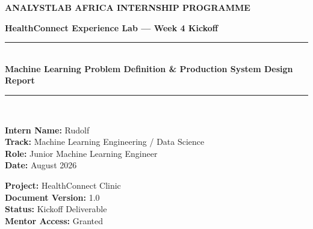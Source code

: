 \documentclass[11pt,a4paper]{article}
\begin{document}
\begin{titlepage}
\centering
\vspace*{1cm}
{\huge\bfseries\color{primary} ANALYSTLAB AFRICA INTERNSHIP PROGRAMME\par}
\vspace{0.5cm}
{\Large\bfseries\color{secondary} HealthConnect Experience Lab — Week 4 Kickoff\par}
\vspace{1.5cm}

\rule{\linewidth}{1.5pt}\\[0.4cm]
{\huge \bfseries Machine Learning Problem Definition \& Production System Design Report}\\[0.4cm]
\rule{\linewidth}{1.5pt}\\[1.5cm]

\begin{minipage}{0.48\textwidth}
\begin{flushleft} \large
\textbf{Intern Name:} Rudolf\\
\textbf{Track:} Machine Learning Engineering / Data Science\\
\textbf{Role:} Junior Machine Learning Engineer\\
\textbf{Date:} August 2026
\end{flushleft}
\end{minipage}
\begin{minipage}{0.48\textwidth}
\begin{flushright} \large
\textbf{Project:} HealthConnect Clinic\\
\textbf{Document Version:} 1.0\\
\textbf{Status:} Kickoff Deliverable\\
\textbf{Mentor Access:} Granted
\end{flushright}
\end{minipage}

\vfill
\begin{abstract}
\noindent This document establishes the foundational Machine Learning Problem Definition and Production System Architecture for the HealthConnect Clinic Experience Lab. Facing high non-attendance rates ($48.46\%$ baseline no-show rate), HealthConnect Clinic requires an automated, predictive, and actionable system to mitigate appointment missed slots, optimize provider schedule utilization, and improve patient support. We formulate a supervised binary classification task $P(\text{No-Show} \mid X)$, evaluate data quality across 5,000 appointment records, present a candidate feature taxonomy across 6 domain categories, define strict data leakage boundaries, and detail an end-to-end production ML system design incorporating real-time inference microservices, automated multi-channel intervention workflows, MLOps monitoring, and HIPAA-compliant governance.
\end{abstract}

\vfill
\end{titlepage}
\end{document}
